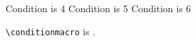 \documentclass{article}
\begin{document}
\ifnum{} Condition is 4\fi
\ifnum{} Condition is 5\fi
\ifnum{} Condition is 6\fi

\verb|\conditionmacro| is \texttt{\meaning\conditionmacro}.
\end{document}
